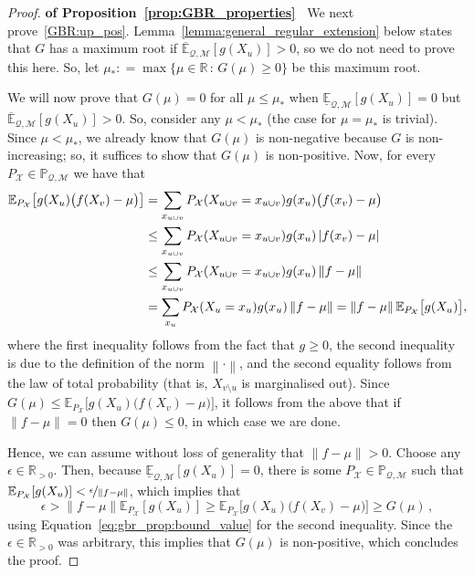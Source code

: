 \documentclass[3p]{elsarticle}
\newcommand{\reals}{\mathbb{R}}
\newcommand{\realspos}{\reals_{>0}}
\newcommand{\states}{\mathcal{X}}
\newcommand{\lexp}{\underline{\mathbb{E}}_{\rateset,\mathcal{M}}}
\newcommand{\uexp}{\overline{\mathbb{E}}_{\rateset,\mathcal{M}}}
\newcommand{\rateset}{\mathcal{Q}}
\newcommand{\norm}[1]{\left\lVert #1 \right\rVert}
\newcommand{\abs}[1]{\left\vert #1 \right\vert}
\newcommand{\coloneqq}{:\!=}
\begin{document}
\begin{proof}{\bf of Proposition~\ref{prop:GBR_properties}~}
We next prove~\ref{GBR:up_pos}. Lemma~\ref{lemma:general_regular_extension} below states that $G$ has a maximum root if $\uexp[g(X_u)]>0$, so we do not need to prove this here. So, let $\mu_*\coloneqq \max\{\mu\in\reals\,:\,G(\mu)\geq 0\}$ be this maximum root.

We will now prove that $G(\mu)=0$ for all $\mu\leq\mu_*$ when $\lexp[g(X_u)]=0$ but $\uexp[g(X_u)]>0$. So, consider any $\mu<\mu_*$ (the case for $\mu=\mu_*$ is trivial). Since $\mu<\mu_*$, we already know that $G(\mu)$ is non-negative because $G$ is non-increasing; so, it suffices to show that $G(\mu)$ is non-positive. Now, for every $P_\states\in\mathbb{P}_{\rateset,\mathcal{M}}$ we have that
\begin{align}
\mathbb{E}_{P_\states}\bigl[g(X_u)\bigl(f(X_v) - \mu\bigr)\bigr] 
&= \sum_{x_{u\cup v}} P_\states(X_{u\cup v}=x_{u\cup v})g(x_u)\bigl(f(x_v)-\mu\bigr) \notag\\
 &\leq \sum_{x_{u\cup v}} P_\states(X_{u\cup v}=x_{u\cup v})g(x_u)\abs{f(x_v)-\mu} \notag\\
 &\leq \sum_{x_{u\cup v}} P_\states(X_{u\cup v}=x_{u\cup v})g(x_u)\norm{f-\mu} \notag\\
 &= \sum_{x_{u}} P_\states(X_{u}=x_{u})g(x_u)\norm{f-\mu}= \norm{f-\mu}\mathbb{E}_{P_\states}\bigl[g(X_u)\bigr],
\label{eq:gbr_prop:bound_value}
\end{align}
where the first inequality follows from the fact that $g\geq 0$, the second inequality is due to the definition of the norm $\norm{\cdot}$, and the second equality follows from the law of total probability (that is, $X_{v\setminus u}$ is marginalised out). Since $G(\mu)\leq \mathbb{E}_{P_\states}\bigl[g(X_u)\bigl(f(X_v) - \mu\bigr)\bigr]$, it follows from the above that if $\norm{f-\mu}=0$ then $G(\mu)\leq 0$, in which case we are done. 

Hence, we can assume without loss of generality that $\norm{f-\mu}>0$. Choose any $\epsilon\in\realspos$. Then, because $\lexp[g(X_u)]=0$, there is some $P_\states\in\mathbb{P}_{\rateset,\mathcal{M}}$ such that $\mathbb{E}_{P_\states}[g(X_u)] < \nicefrac{\epsilon}{\norm{f-\mu}}$, which implies that
\begin{equation*}
\epsilon > \norm{f-\mu}\mathbb{E}_{P_\states}[g(X_u)] \geq \mathbb{E}_{P_\states}\bigl[g(X_u)\bigl(f(X_v) - \mu\bigr)\bigr] \geq G(\mu)\,,
\end{equation*}
using Equation~\eqref{eq:gbr_prop:bound_value} for the second inequality. Since the $\epsilon\in\realspos$ was arbitrary, this implies that $G(\mu)$ is non-positive, which concludes the proof.


\end{proof}
\end{document}
